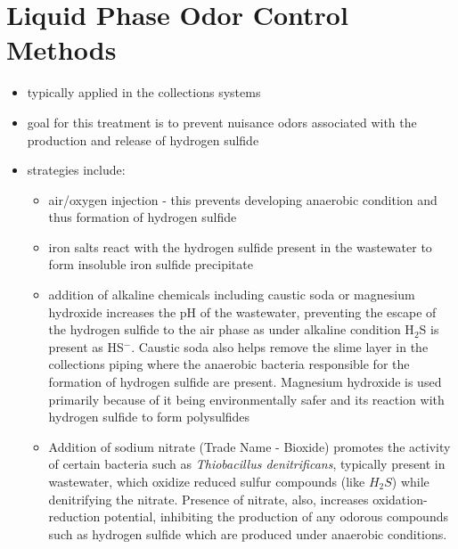 \section{Liquid Phase Odor Control Methods}
\begin{itemize}
	\item typically applied in the collections systems
	\item goal for this treatment is to prevent nuisance odors associated with the production and release of hydrogen sulfide
	\item strategies include:
		\begin{itemize}
			\item air/oxygen injection - this prevents developing anaerobic condition and thus  formation of hydrogen sulfide
			\item iron salts react with the hydrogen sulfide present in the wastewater to form insoluble iron sulfide precipitate
			\item addition of alkaline chemicals including caustic soda or magnesium hydroxide increases the pH of the wastewater, preventing the escape of the hydrogen sulfide to the air phase as under alkaline condition H$_2$S is present as HS$^-$.  Caustic soda also helps remove the slime layer in the collections piping where the anaerobic bacteria responsible for the formation of hydrogen sulfide are present.  Magnesium hydroxide is used primarily because of it being environmentally safer and its reaction with hydrogen sulfide to form polysulfides
			\item Addition of sodium nitrate (Trade Name - Bioxide) promotes the activity of certain bacteria such as \textit{Thiobacillus denitrificans}, typically present in wastewater, which oxidize reduced sulfur compounds (like $H_2S$) while denitrifying the nitrate.  Presence of nitrate, also, increases oxidation-reduction potential, inhibiting the production of any odorous compounds such as hydrogen sulfide which are produced under anaerobic conditions.
		\end{itemize} 
\end{itemize}


